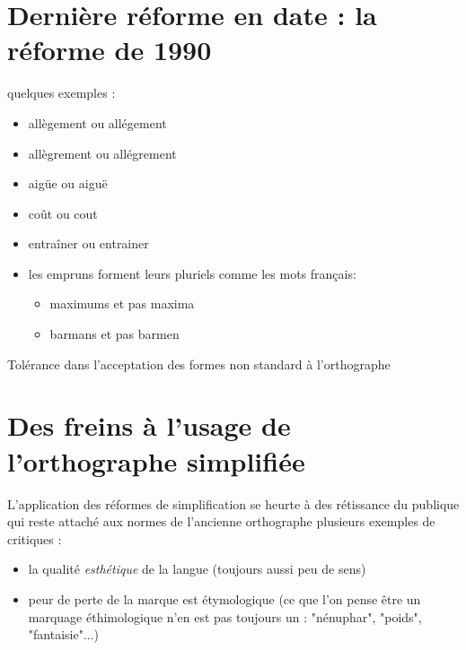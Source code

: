 \section{Dernière réforme en date : la réforme de 1990}
quelques exemples :
\begin{itemize}
   \item allègement ou allégement
   \item allègrement ou allégrement
   \item aigüe ou aiguë
   \item coût ou cout
   \item entraîner ou entrainer
   \item les empruns forment leurs pluriels comme les mots français:
   \begin{itemize} 
      \item maximums et pas maxima
      \item barmans et pas barmen
   \end{itemize}
\end{itemize}
Tolérance dans l'acceptation des formes non standard à l'orthographe 
\section{Des freins à l'usage de l'orthographe simplifiée}
L'application des réformes de simplification se heurte à des rétissance du publique qui reste attaché aux normes de l'ancienne orthographe
plusieurs exemples de critiques :
\begin{itemize}
   \item la qualité \textit{esthétique} de la langue (toujours aussi peu de sens)
   \item peur de perte de la marque est étymologique (ce que l'on pense être un marquage éthimologique n'en est pas toujours un : "nénuphar", "poids", "fantaisie"...)
\end{itemize}

